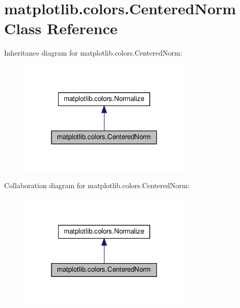 \hypertarget{classmatplotlib_1_1colors_1_1CenteredNorm}{}\section{matplotlib.\+colors.\+Centered\+Norm Class Reference}
\label{classmatplotlib_1_1colors_1_1CenteredNorm}


Inheritance diagram for matplotlib.\+colors.\+Centered\+Norm\+:
\nopagebreak
\begin{figure}[H]
\begin{center}
\leavevmode
\includegraphics[width=235pt]{classmatplotlib_1_1colors_1_1CenteredNorm__inherit__graph}
\end{center}
\end{figure}


Collaboration diagram for matplotlib.\+colors.\+Centered\+Norm\+:
\nopagebreak
\begin{figure}[H]
\begin{center}
\leavevmode
\includegraphics[width=235pt]{classmatplotlib_1_1colors_1_1CenteredNorm__coll__graph}
\end{center}
\end{figure}
